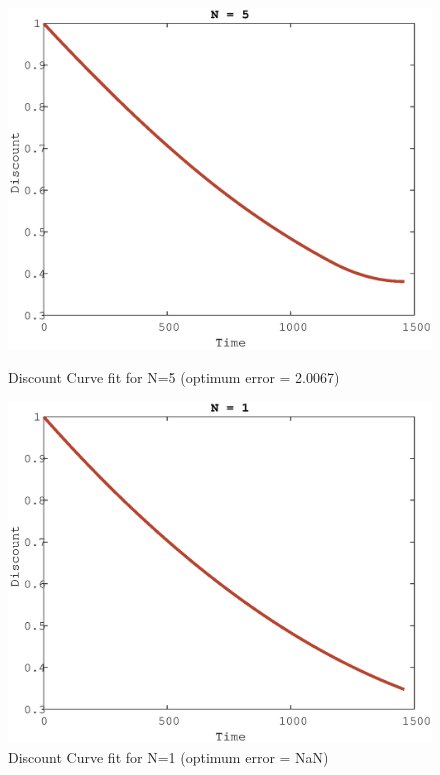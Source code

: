 \documentclass[a4paper]{article}
\begin{document}
\begin{figure}[!ht]
  \centering
  \begin{minipage}[b]{0.4\textwidth}
    \includegraphics[width=1.0\textwidth]{N5.eps}
    \caption{Discount Curve fit for N=5 (optimum error = 2.0067)}
  \end{minipage}
  \hfill
  \begin{minipage}[b]{0.4\textwidth}
    \includegraphics[width=1.0\textwidth]{N1.eps}
    \caption{Discount Curve fit for N=1 (optimum error = NaN)}
  \end{minipage}
\end{figure}
\end{document}
